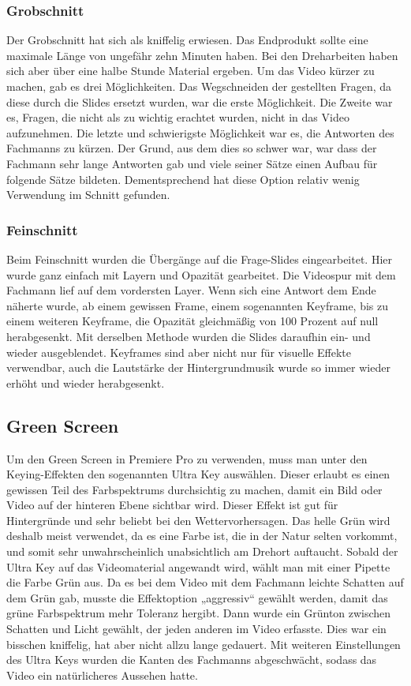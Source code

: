 \subsubsection{Grobschnitt}
Der Grobschnitt hat sich als kniffelig erwiesen. Das Endprodukt sollte eine maximale Länge von ungefähr zehn Minuten haben. Bei den Dreharbeiten haben sich aber über eine halbe Stunde Material ergeben. Um das Video kürzer zu machen, gab es drei Möglichkeiten. Das Wegschneiden der gestellten Fragen, da diese durch die Slides ersetzt wurden, war die erste Möglichkeit. Die Zweite war es, Fragen, die nicht als zu wichtig erachtet wurden, nicht in das Video aufzunehmen. Die letzte und schwierigste Möglichkeit war es, die Antworten des Fachmanns zu kürzen. Der Grund, aus dem dies so schwer war, war dass der Fachmann sehr lange Antworten gab und viele seiner Sätze einen Aufbau für folgende Sätze bildeten. Dementsprechend hat diese Option relativ wenig Verwendung im Schnitt gefunden.
\subsubsection{Feinschnitt}
Beim Feinschnitt wurden die Übergänge auf die Frage-Slides eingearbeitet. Hier wurde ganz einfach mit Layern und Opazität gearbeitet. Die Videospur mit dem Fachmann lief auf dem vordersten Layer. Wenn sich eine Antwort dem Ende näherte wurde, ab einem gewissen Frame, einem sogenannten Keyframe, bis zu einem weiteren Keyframe, die Opazität gleichmäßig von 100 Prozent auf null herabgesenkt. Mit derselben Methode wurden die Slides daraufhin ein- und wieder ausgeblendet. Keyframes sind aber nicht nur für visuelle Effekte verwendbar, auch die Lautstärke der Hintergrundmusik wurde so immer wieder erhöht und wieder herabgesenkt.\cite{keyframes}
\subsection{Green Screen}
Um den Green Screen in Premiere Pro zu verwenden, muss man unter den Keying-Effekten den sogenannten Ultra Key auswählen. Dieser erlaubt es einen gewissen Teil des Farbspektrums durchsichtig zu machen, damit ein Bild oder Video auf der hinteren Ebene sichtbar wird. Dieser Effekt ist gut für Hintergründe und sehr beliebt bei den Wettervorhersagen. Das helle Grün wird deshalb meist verwendet, da es eine Farbe ist, die in der Natur selten vorkommt, und somit sehr unwahrscheinlich unabsichtlich am Drehort auftaucht. Sobald der Ultra Key auf das Videomaterial angewandt wird, wählt man mit einer Pipette die Farbe Grün aus. Da es bei dem Video mit dem Fachmann leichte Schatten auf dem Grün gab, musste die Effektoption „aggressiv“ gewählt werden, damit das grüne Farbspektrum mehr Toleranz hergibt. Dann wurde ein Grünton zwischen Schatten und Licht gewählt, der jeden anderen im Video erfasste. Dies war ein bisschen kniffelig, hat aber nicht allzu lange gedauert. Mit weiteren Einstellungen des Ultra Keys wurden die Kanten des Fachmanns abgeschwächt, sodass das Video ein natürlicheres Aussehen hatte.\cite{ultra}

